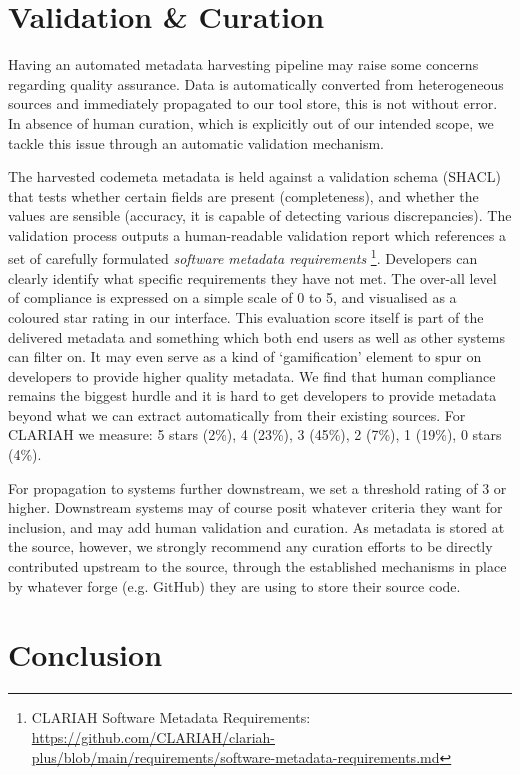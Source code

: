 \documentclass[a4paper,11pt]{article}
\begin{document}
\section{Validation \& Curation}

Having an automated metadata harvesting pipeline may raise some concerns
regarding quality assurance. Data is automatically converted from heterogeneous
sources and immediately propagated to our tool store, this is not without
error. In absence of human curation, which is explicitly out of our intended
scope, we tackle this issue through an automatic validation mechanism.

The harvested codemeta metadata is held against a validation
schema (SHACL) that tests whether certain fields are
present (completeness), and whether the values are sensible (accuracy, it is
capable of detecting various discrepancies). The validation process outputs a
human-readable validation report which references a set of carefully formulated
\emph{software metadata requirements} \footnote{CLARIAH Software Metadata
Requirements:
\url{https://github.com/CLARIAH/clariah-plus/blob/main/requirements/software-metadata-requirements.md}}.
Developers can clearly identify what specific requirements they have not met.
The over-all level of compliance is expressed on a simple scale of 0 to 5, and
visualised as a coloured star rating in our interface. This evaluation score
itself is part of the delivered metadata and something which both end users as
well as other systems can filter on. It may even serve as a kind of
`gamification' element to spur on developers to provide higher quality
metadata. We find that human compliance remains the biggest hurdle and it is
hard to get developers to provide metadata beyond what we can extract
automatically from their existing sources. For CLARIAH we measure: 5 stars
(2\%), 4 (23\%), 3 (45\%), 2 (7\%), 1 (19\%), 0 stars (4\%).

For propagation to systems further downstream, we set a threshold rating of 3
or higher. Downstream systems may of course posit whatever criteria they want
for inclusion, and may add human validation and curation. As metadata is stored
at the source, however, we strongly recommend any curation efforts to be
directly contributed upstream to the source, through the established mechanisms
in place by whatever forge (e.g. GitHub) they are using to store their source
code.

\section{Conclusion}
\end{document}
